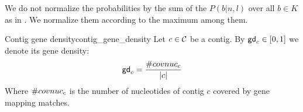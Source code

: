 \begin{newfeatbox}
    We do not normalize the probabilities by the sum of the \(P(b|n,l)\) over all \(b \in K\) as in \cite{manePlasBinflowFlowbasedMILP2023}. We normalize them according to the maximum among them.
\end{newfeatbox}

\begin{definition}{Contig gene density}{contig_gene_density}
    Let \(c \in \mathcal{C}{}\) be a contig.
    By \(\mathsf{gd}_{c} \in [0, 1]\) we denote its gene density:
    \[
    \mathsf{gd}_{c} = \frac{ \#covnuc_{c} }{ |c| }
    \]
    Where \(\#covnuc_{c}\) is the number of nucleotides of contig \(c\) covered by gene mapping matches.
\end{definition}